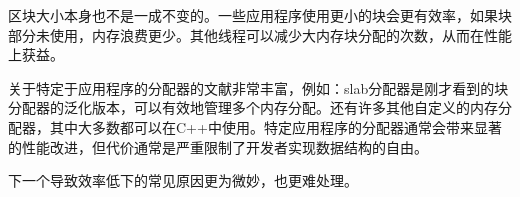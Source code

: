 区块大小本身也不是一成不变的。一些应用程序使用更小的块会更有效率，如果块部分未使用，内存浪费更少。其他线程可以减少大内存块分配的次数，从而在性能上获益。

关于特定于应用程序的分配器的文献非常丰富，例如：slab分配器是刚才看到的块分配器的泛化版本，可以有效地管理多个内存分配。还有许多其他自定义的内存分配器，其中大多数都可以在C++中使用。特定应用程序的分配器通常会带来显著的性能改进，但代价通常是严重限制了开发者实现数据结构的自由。

下一个导致效率低下的常见原因更为微妙，也更难处理。





















